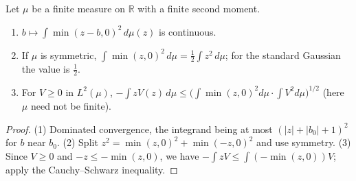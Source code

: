 \begin{lemma}\label{lem:sg-tal:st-half-line}
  \leanok
{}
Let $\mu$ be a finite measure on $\mathbb R$ with a finite second moment.
\begin{enumerate}
\item $b\mapsto\int\min(z-b,0)^2\,d\mu(z)$ is continuous.
\item If $\mu$ is symmetric, $\int\min(z,0)^2\,d\mu=\tfrac12\int z^2\,d\mu$; for the standard Gaussian the value
is $\tfrac12$.
\item For $V\ge0$ in $L^2(\mu)$,
$-\int zV(z)\,d\mu\le\bigl(\int\min(z,0)^2d\mu\cdot\int V^2d\mu\bigr)^{1/2}$
(here $\mu$ need not be finite).
\end{enumerate}
\end{lemma}
\begin{proof}
  \leanok
(1) Dominated convergence, the integrand being at most $(|z|+|b_0|+1)^2$ for $b$ near $b_0$. (2) Split
$z^2=\min(z,0)^2+\min(-z,0)^2$ and use symmetry. (3) Since $V\ge0$ and $-z\le-\min(z,0)$, we have
$-\int zV\le\int(-\min(z,0))V$; apply the Cauchy--Schwarz inequality.
\end{proof}

